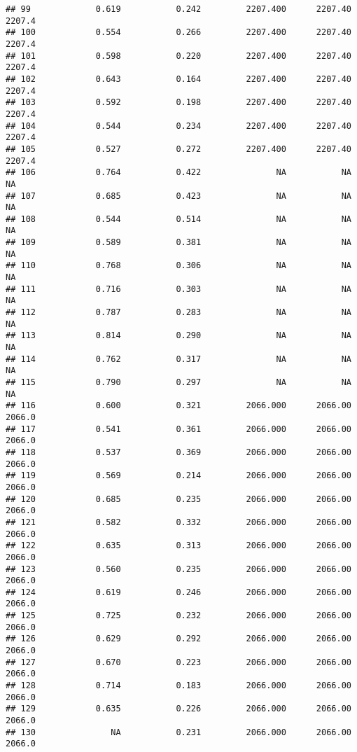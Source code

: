 \documentclass[
]{article}
\begin{document}
\begin{verbatim}
## 99             0.619           0.242         2207.400      2207.40       2207.4
## 100            0.554           0.266         2207.400      2207.40       2207.4
## 101            0.598           0.220         2207.400      2207.40       2207.4
## 102            0.643           0.164         2207.400      2207.40       2207.4
## 103            0.592           0.198         2207.400      2207.40       2207.4
## 104            0.544           0.234         2207.400      2207.40       2207.4
## 105            0.527           0.272         2207.400      2207.40       2207.4
## 106            0.764           0.422               NA           NA           NA
## 107            0.685           0.423               NA           NA           NA
## 108            0.544           0.514               NA           NA           NA
## 109            0.589           0.381               NA           NA           NA
## 110            0.768           0.306               NA           NA           NA
## 111            0.716           0.303               NA           NA           NA
## 112            0.787           0.283               NA           NA           NA
## 113            0.814           0.290               NA           NA           NA
## 114            0.762           0.317               NA           NA           NA
## 115            0.790           0.297               NA           NA           NA
## 116            0.600           0.321         2066.000      2066.00       2066.0
## 117            0.541           0.361         2066.000      2066.00       2066.0
## 118            0.537           0.369         2066.000      2066.00       2066.0
## 119            0.569           0.214         2066.000      2066.00       2066.0
## 120            0.685           0.235         2066.000      2066.00       2066.0
## 121            0.582           0.332         2066.000      2066.00       2066.0
## 122            0.635           0.313         2066.000      2066.00       2066.0
## 123            0.560           0.235         2066.000      2066.00       2066.0
## 124            0.619           0.246         2066.000      2066.00       2066.0
## 125            0.725           0.232         2066.000      2066.00       2066.0
## 126            0.629           0.292         2066.000      2066.00       2066.0
## 127            0.670           0.223         2066.000      2066.00       2066.0
## 128            0.714           0.183         2066.000      2066.00       2066.0
## 129            0.635           0.226         2066.000      2066.00       2066.0
## 130               NA           0.231         2066.000      2066.00       2066.0

\end{verbatim}
\end{document}
